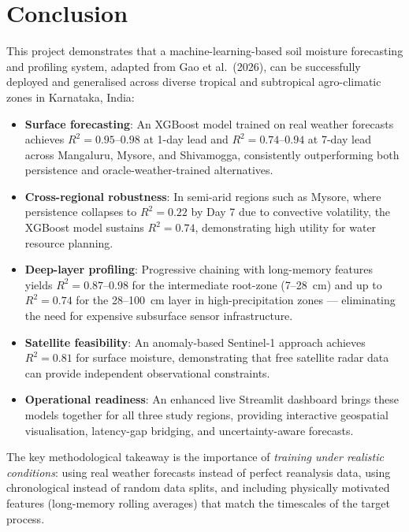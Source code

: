 \documentclass[12pt, a4paper]{article}
\begin{document}

\section{Conclusion}

This project demonstrates that a machine-learning-based soil moisture forecasting and profiling system, adapted from Gao et al.\ (2026), can be successfully deployed and generalised across diverse tropical and subtropical agro-climatic zones in Karnataka, India:

\begin{itemize}
    \item \textbf{Surface forecasting}: An XGBoost model trained on real weather forecasts achieves $R^2 = 0.95$--$0.98$ at 1-day lead and $R^2 = 0.74$--$0.94$ at 7-day lead across Mangaluru, Mysore, and Shivamogga, consistently outperforming both persistence and oracle-weather-trained alternatives.
    
    \item \textbf{Cross-regional robustness}: In semi-arid regions such as Mysore, where persistence collapses to $R^2 = 0.22$ by Day 7 due to convective volatility, the XGBoost model sustains $R^2 = 0.74$, demonstrating high utility for water resource planning.

    \item \textbf{Deep-layer profiling}: Progressive chaining with long-memory features yields $R^2 = 0.87$--$0.98$ for the intermediate root-zone (7--28~cm) and up to $R^2 = 0.74$ for the 28--100~cm layer in high-precipitation zones --- eliminating the need for expensive subsurface sensor infrastructure.
    
    \item \textbf{Satellite feasibility}: An anomaly-based Sentinel-1 approach achieves $R^2 = 0.81$ for surface moisture, demonstrating that free satellite radar data can provide independent observational constraints.
    
    \item \textbf{Operational readiness}: An enhanced live Streamlit dashboard brings these models together for all three study regions, providing interactive geospatial visualisation, latency-gap bridging, and uncertainty-aware forecasts.
\end{itemize}

The key methodological takeaway is the importance of \textit{training under realistic conditions}: using real weather forecasts instead of perfect reanalysis data, using chronological instead of random data splits, and including physically motivated features (long-memory rolling averages) that match the timescales of the target process.
\end{document}
